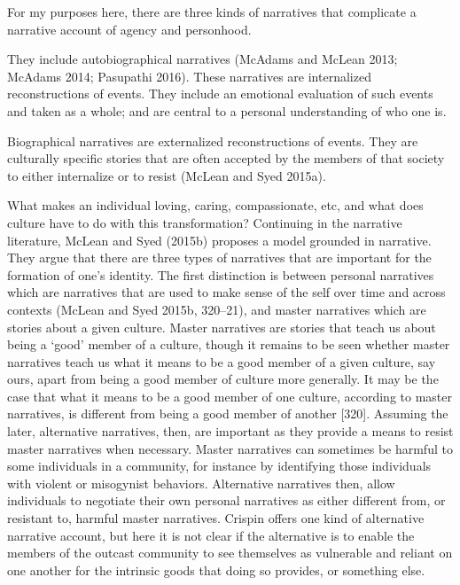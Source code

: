 \documentclass[
  letterpaper,
  DIV=11,
  numbers=noendperiod]{scrartcl}
\theoremstyle{remark}
\begin{document}
For my purposes here, there are three kinds of narratives that
complicate a narrative account of agency and personhood.

They include autobiographical narratives (McAdams and McLean 2013;
McAdams 2014; Pasupathi 2016). These narratives are internalized
reconstructions of events. They include an emotional evaluation of such
events and taken as a whole; and are central to a personal understanding
of who one is.

Biographical narratives are externalized reconstructions of events. They
are culturally specific stories that are often accepted by the members
of that society to either internalize or to resist (McLean and Syed
2015a).

What makes an individual loving, caring, compassionate, etc, and what
does culture have to do with this transformation? Continuing in the
narrative literature, McLean and Syed (2015b) proposes a model grounded
in narrative. They argue that there are three types of narratives that
are important for the formation of one's identity. The first distinction
is between personal narratives which are narratives that are used to
make sense of the self over time and across contexts (McLean and Syed
2015b, 320--21), and master narratives which are stories about a given
culture. Master narratives are stories that teach us about being a
`good' member of a culture, though it remains to be seen whether master
narratives teach us what it means to be a good member of a given
culture, say ours, apart from being a good member of culture more
generally. It may be the case that what it means to be a good member of
one culture, according to master narratives, is different from being a
good member of another {[}320{]}. Assuming the later, alternative
narratives, then, are important as they provide a means to resist master
narratives when necessary. Master narratives can sometimes be harmful to
some individuals in a community, for instance by identifying those
individuals with violent or misogynist behaviors. Alternative narratives
then, allow individuals to negotiate their own personal narratives as
either different from, or resistant to, harmful master narratives.
Crispin offers one kind of alternative narrative account, but here it is
not clear if the alternative is to enable the members of the outcast
community to see themselves as vulnerable and reliant on one another for
the intrinsic goods that doing so provides, or something else.
\end{document}
